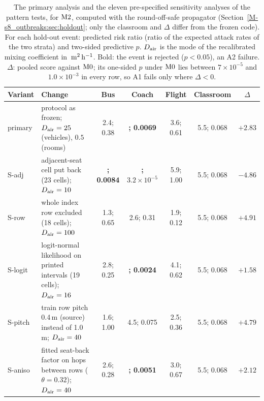 \begin{table}[tbp]
  \centering\footnotesize
  \setlength{\tabcolsep}{3.6pt}
  \caption{The primary analysis and the eleven pre-specified sensitivity analyses of the pattern tests, for
  $\mathrm{M2}$, computed with the round-off-safe propagator (Section~\ref{M-s8_outbreaks:sec:holdout}; only the
  classroom and $\Delta$ differ from the frozen code). For each hold-out event: predicted risk ratio (ratio
  of the expected attack rates of the two strata) and two-sided predictive $p$. $D_{\mathrm{air}}$ is the mode of the
  recalibrated mixing coefficient in $\,\mathrm{m}^2\,\mathrm{h}^{-1}$. Bold: the event is rejected ($p<0.05$), an A2 failure. $\Delta$:
  pooled score against $\mathrm{M0}$; its one-sided $p$ under $\mathrm{M0}$ lies between $7\times10^{-5}$ and
  $1.0\times10^{-3}$ in every row, so A1 fails only where $\Delta<0$.}
  \label{appC_protocol:tab:sensitivity}
  \begin{tabular}{@{}l>{\raggedright\arraybackslash}p{}ccccc@{}}
    \toprule
    Variant & Change & Bus & Coach & Flight & Classroom & $\Delta$ \\
    \midrule
    primary & protocol as frozen; $D_{\mathrm{air}}=25$ (vehicles), $0.5$ (rooms) & 2.4; 0.38 & {\bfseries\boldmath 11; 0.0069} & 3.6; 0.61 & 5.5; 0.068 & $+2.83$ \\
    S-adj & adjacent-seat cell put back (23 cells); $D_{\mathrm{air}}=10$ & {\bfseries\boldmath 5.4; 0.0084} & {\bfseries\boldmath 51; $3.2\times10^{-5}$} & 5.9; 1.00 & 5.5; 0.068 & $-4.86$ \\
    S-row & whole index row excluded (18 cells); $D_{\mathrm{air}}=100$ & 1.3; 0.65 & 2.6; 0.31 & 1.9; 0.12 & 5.5; 0.068 & $+4.91$ \\
    S-logit & logit-normal likelihood on printed intervals (19 cells); $D_{\mathrm{air}}=16$ & 2.8; 0.25 & {\bfseries\boldmath 15; 0.0024} & 4.1; 0.62 & 5.5; 0.068 & $+1.58$ \\
    S-pitch & train row pitch 0.4\,m (source) instead of 1.0\,m; $D_{\mathrm{air}}=40$ & 1.6; 1.00 & 4.5; 0.075 & 2.5; 0.36 & 5.5; 0.068 & $+4.79$ \\
    S-aniso & fitted seat-back factor on hops between rows ($\theta=0.32$); $D_{\mathrm{air}}=40$ & 2.6; 0.28 & {\bfseries\boldmath 13; 0.0051} & 3.0; 0.67 & 5.5; 0.068 & $+2.12$ \\

\end{tabular}
\end{table}
